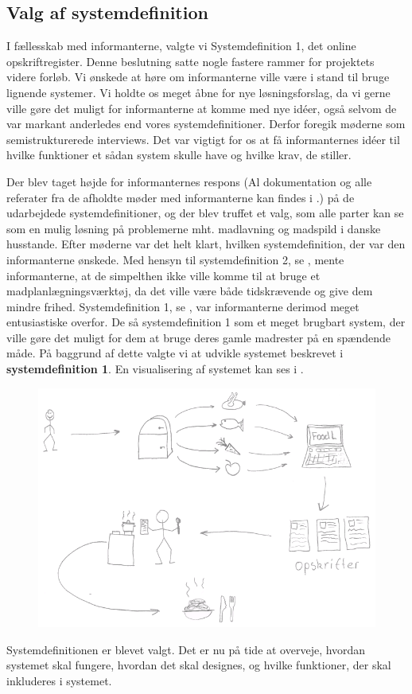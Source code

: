 \subsection{Valg af systemdefinition}
\label{subsec:valgafsystemdefinition}

I fællesskab med informanterne, valgte vi Systemdefinition 1, det online opskriftregister. Denne beslutning satte nogle fastere rammer for projektets videre forløb. Vi ønskede at høre om informanterne ville være i stand til bruge lignende systemer. Vi holdte os meget åbne for nye løsningsforslag, da vi gerne ville gøre det muligt for informanterne at komme med nye idéer, også selvom de var markant anderledes end vores systemdefinitioner. Derfor foregik møderne som semistrukturerede interviews. Det var vigtigt for os at få informanternes idéer til hvilke funktioner et sådan system skulle have og hvilke krav, de stiller.

Der blev taget højde for informanternes respons (Al dokumentation og alle referater fra de afholdte møder med informanterne kan findes i .) på de udarbejdede systemdefinitioner, og der blev truffet et valg, som alle parter kan se som en mulig løsning på problemerne mht. madlavning og madspild i danske husstande. Efter møderne var det helt klart, hvilken systemdefinition, der var den informanterne ønskede. Med hensyn til systemdefinition 2, se , mente informanterne, at de simpelthen ikke ville komme til at bruge et madplanlægningsværktøj, da det ville være både tidskrævende og give dem mindre frihed. Systemdefinition 1, se , var informanterne derimod meget entusiastiske overfor. De så systemdefinition 1 som et meget brugbart system, der ville gøre det muligt for dem at bruge deres gamle madrester på en spændende måde. På baggrund af dette valgte vi at udvikle systemet beskrevet i \textbf{systemdefinition 1}. En visualisering af systemet kan ses i .

\begin{figure}
\centering
\includegraphics[scale=0.6]{billeder/rigebilleder/anvendelsesomraade.png}
\label{fig:rigbillede2}
\end{figure}

Systemdefinitionen er blevet valgt. Det er nu på tide at overveje, hvordan systemet skal fungere, hvordan det skal designes, og hvilke funktioner, der skal inkluderes i systemet.
